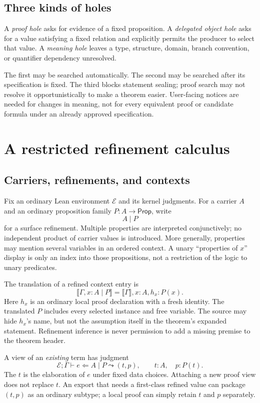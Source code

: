 \documentclass[11pt,letterpaper]{article}
\newcommand{\sem}[1]{\llbracket #1\rrbracket}
\newcommand{\Prop}{\mathsf{Prop}}
\theoremstyle{definition}
\theoremstyle{remark}
\begin{document}
\subsection{Three kinds of holes}
A \emph{proof hole} asks for evidence of a fixed proposition. A \emph{delegated
object hole} asks for a value satisfying a fixed relation and explicitly
permits the producer to select that value. A \emph{meaning hole} leaves a type,
structure, domain, branch convention, or quantifier dependency unresolved.

The first may be searched automatically. The second may be searched after its
specification is fixed. The third blocks statement sealing; proof search may
not resolve it opportunistically to make a theorem easier. User-facing notices
are needed for changes in meaning, not for every equivalent proof or candidate
formula under an already approved specification.

\section{A restricted refinement calculus}\label{sec:calculus}

\subsection{Carriers, refinements, and contexts}
Fix an ordinary Lean environment $\mathcal E$ and its kernel judgments. For a
carrier $A$ and an ordinary proposition family $P:A\to\Prop$, write
\[
                         A\mid P
\]
for a surface refinement. Multiple properties are interpreted conjunctively;
no independent product of carrier values is introduced. More generally,
properties may mention several variables in an ordered context. A unary
``properties of $x$'' display is only an index into those propositions, not a
restriction of the logic to unary predicates.

The translation of a refined context entry is
\[
  \sem{\Gamma,x:A\mid P}
       =\sem\Gamma,x:A,h_x:P(x).
\]
Here $h_x$ is an ordinary local proof declaration with a fresh identity. The
translated $P$ includes every selected instance and free variable. The source
may hide $h_x$'s name, but not the assumption itself in the theorem's expanded
statement. Refinement inference is never permission to add a missing premise
to the theorem header.

A view of an \emph{existing} term has judgment
\[
  \mathcal E;\Gamma\vdash e\Leftarrow A\mid P
       \leadsto (t,p),
       \qquad t:A,\quad p:P(t).
\]
The $t$ is the elaboration of $e$ under fixed data choices. Attaching a new proof
view does not replace $t$. An export that needs a first-class refined value
can package $(t,p)$ as an ordinary subtype; a local proof can simply retain
$t$ and $p$ separately.
\end{document}
